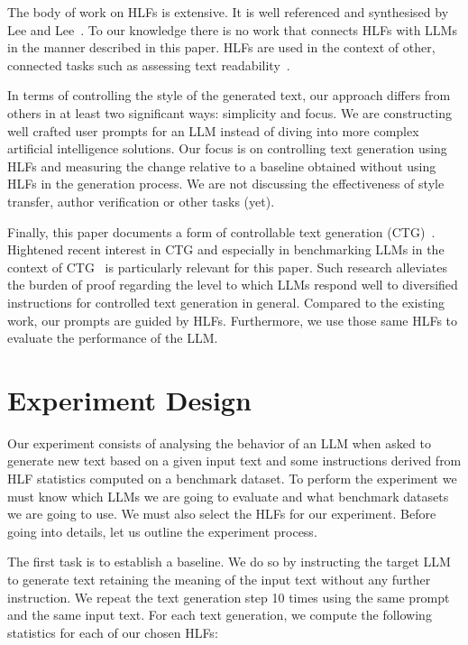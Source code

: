 \documentclass[runningheads,a4paper,11pt]{article}
\begin{document}
The body of work on HLFs is extensive.
It is well referenced and synthesised by Lee and Lee~\cite{lftk-2023}.
To our knowledge there is no work that connects HLFs with LLMs in the manner
described in this paper.
HLFs are used in the context of other, connected tasks such as assessing text
readability~\cite{lee-etal-2021-pushing}.

In terms of controlling the style of the generated text, our approach differs
from others in at least two significant ways: simplicity and focus.
We are constructing well crafted user prompts for an LLM instead of diving into
more complex artificial intelligence solutions.
Our focus is on controlling text generation using HLFs and measuring the change
relative to a baseline obtained without using HLFs in the generation process.
We are not discussing the effectiveness of style transfer, author verification
or other tasks (yet).

Finally, this paper documents a form of controllable text generation
(CTG)~\cite{zhang-ctg-2022}.
Hightened recent interest in CTG and especially in benchmarking LLMs in the
context of CTG~\cite{chen2024benchmarking} is particularly relevant for this
paper.
Such research alleviates the burden of proof regarding the level to which
LLMs respond well to diversified instructions for controlled text generation in
general.
Compared to the existing work, our prompts are guided by HLFs.
Furthermore, we use those same HLFs to evaluate the performance of the LLM.

\section{Experiment Design}\label{method}

Our experiment consists of analysing the behavior of an LLM when asked to
generate new text based on a given input text and some instructions derived from
HLF statistics computed on a benchmark dataset.
To perform the experiment we must know which LLMs we are going to evaluate and
what benchmark datasets we are going to use.
We must also select the HLFs for our experiment.
Before going into details, let us outline the experiment process.

The first task is to establish a baseline.
We do so by instructing the target LLM to generate text retaining the meaning of
the input text without any further instruction.
We repeat the text generation step 10 times using the same prompt and the same
input text.
For each text generation, we compute the following statistics for each of our
chosen HLFs:
\end{document}
